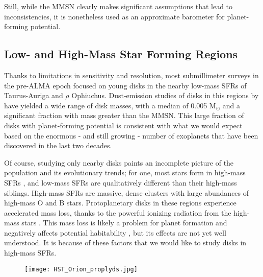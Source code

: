 Still, while the MMSN clearly makes significant assumptions that lead to inconsistencies, it is nonetheless used as an approximate barometer for planet-forming potential.




\subsection{Low- and High-Mass Star Forming Regions}
Thanks to limitations in sensitivity and resolution, most submillimeter surveys in the pre-ALMA epoch focused on young disks in the nearby low-mass SFRs of Taurus-Auriga and $\rho$ Ophiuchus. Dust-emission studies of disks in this regions by \citet{AndrewsWilliams2005,AndrewsWilliams2007} have yielded a wide range of disk masses, with a median of 0.005 M$_{\odot}$ and a significant fraction with mass greater than the MMSN. This large fraction of disks with planet-forming potential is consistent with what we would expect based on the enormous - and still growing - number of exoplanets that have been discovered in the last two decades.


Of course, studying only nearby disks paints an incomplete picture of the population and its evolutionary trends; for one, most stars form in high-mass SFRs \citep{LadaLada2003,Mann2015}, and low-mass SFRs are qualitatively different than their high-mass siblings. High-mass SFRs are massive, dense clusters with large abundances of high-mass O and B stars. Protoplanetary disks in these regions experience accelerated mass loss, thanks to the powerful ionizing radiation from the high-mass stars \citep{Anderson2013,Kalyaan2015,Xiao2018}. This mass loss is likely a problem for planet formation \citep{Johnstone1998,Ovelar2012} and negatively affects potential habitability \citep{Kruijssen2019}, but its effects are not yet well understood. It is because of these factors that we would like to study disks in high-mass SFRs.


\begin{figure}[t!]
\centering
  \texttt{[image: HST\_Orion\_proplyds.jpg]}
  \label{fig:HST_ONC}
\end{figure}



